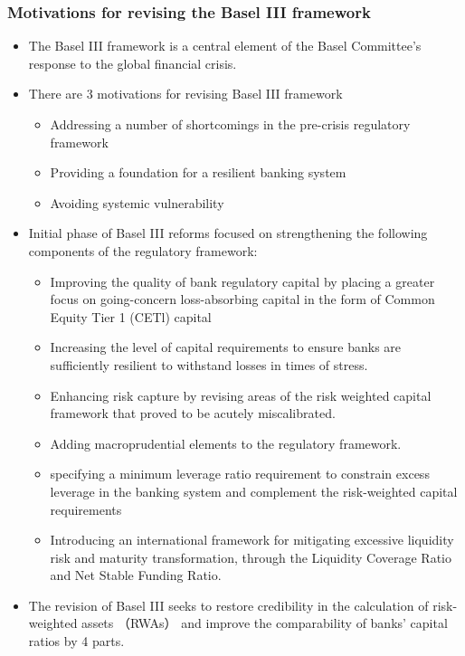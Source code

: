 \subsubsection{Motivations for revising the Basel III framework}
\begin{itemize}
\item The Basel III framework is a central element of the Basel Committee's response to the global financial crisis.
\item There are 3 motivations for revising Basel III framework
    \begin{itemize}
    \item Addressing a number of shortcomings in the pre-crisis regulatory framework
    \item Providing a foundation for a resilient banking system
    \item Avoiding systemic vulnerability
    \end{itemize}
\item Initial phase of Basel III reforms focused on strengthening the following components of the regulatory framework:
    \begin{itemize}
    \item Improving the quality of bank regulatory capital by placing a greater focus on going-concern loss-absorbing capital in the form of Common Equity Tier 1 (CETl) capital
    \item Increasing the level of capital requirements to ensure banks are sufficiently resilient to withstand losses in times of stress.
    \item Enhancing risk capture by revising areas of the risk weighted capital framework that proved to be acutely miscalibrated.
    \item Adding macroprudential elements to the regulatory framework.
    \item specifying a minimum leverage ratio requirement to constrain excess leverage in the banking system and complement the risk-weighted capital requirements
    \item Introducing an international framework for mitigating excessive liquidity risk and maturity transformation, through the Liquidity Coverage Ratio and Net Stable Funding Ratio.
    \end{itemize}
\item The revision of Basel III seeks to restore credibility in the calculation of risk-weighted assets （RWAs） and improve the comparability of banks' capital ratios by 4 parts.
    \begin{itemize}

\end{itemize}
\end{itemize}

